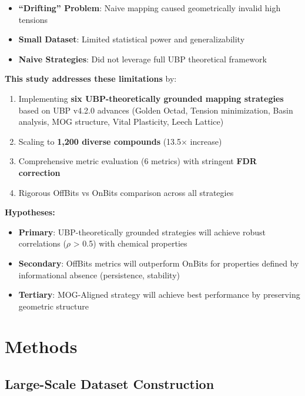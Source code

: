\documentclass[11pt,letterpaper]{article}
\begin{document}
\begin{itemize}
    \item \textbf{``Drifting'' Problem}: Naive mapping caused geometrically invalid high tensions
    \item \textbf{Small Dataset}: Limited statistical power and generalizability
    \item \textbf{Naive Strategies}: Did not leverage full UBP theoretical framework
\end{itemize}

\textbf{This study addresses these limitations} by:
\begin{enumerate}
    \item Implementing \textbf{six UBP-theoretically grounded mapping strategies} based on UBP v4.2.0 advances (Golden Octad, Tension minimization, Basin analysis, MOG structure, Vital Plasticity, Leech Lattice)
    \item Scaling to \textbf{1,200 diverse compounds} (13.5$\times$ increase)
    \item Comprehensive metric evaluation (6 metrics) with stringent \textbf{FDR correction}
    \item Rigorous OffBits vs OnBits comparison across all strategies
\end{enumerate}

\textbf{Hypotheses:}
\begin{itemize}
    \item \textbf{Primary}: UBP-theoretically grounded strategies will achieve robust correlations ($\rho$ > 0.5) with chemical properties
    \item \textbf{Secondary}: OffBits metrics will outperform OnBits for properties defined by informational absence (persistence, stability)
    \item \textbf{Tertiary}: MOG-Aligned strategy will achieve best performance by preserving geometric structure
\end{itemize}

\section{Methods}

\subsection{Large-Scale Dataset Construction}
\end{document}
